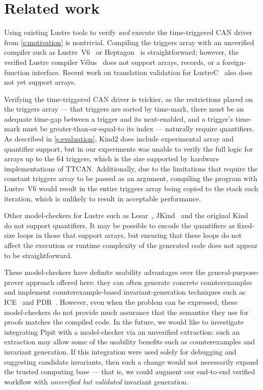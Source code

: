 
\section{Related work}
\label{s:related-work}


Using existing Lustre tools to verify \emph{and} execute the time-triggered CAN driver from \autoref{s:motivation} is nontrivial.
Compiling the triggers array with an unverified compiler such as Lustre~V6~\cite{jahier2016lustre} or Heptagon~\cite{gerard2012modular} is straightforward; however, the verified Lustre compiler Vélus~\cite{bourke2023verified} does not support arrays, records, or a foreign-function interface.
Recent work on translation validation for LustreC~\cite{brun2023equation} also does not yet support arrays.

Verifying the time-triggered CAN driver is trickier, as the restrictions placed on the triggers array --- that triggers are sorted by time-mark, there must be an adequate time-gap between a trigger and its next-enabled, and a trigger's time-mark must be greater-than-or-equal-to its index --- naturally require quantifiers.
As described in \autoref{s:evaluation}, Kind2 does include experimental array and quantifier support, but in our experiments was unable to verify the full logic for arrays up to the 64 triggers, which is the size supported by hardware implementations of TTCAN.
Additionally, due to the limitations that require the constant triggers array to be passed as an argument, compiling the program with Lustre~V6 would result in the entire triggers array being copied to the stack each iteration, which is unlikely to result in acceptable performance.

Other model-checkers for Lustre such as Lesar~\cite{raymond2008synchronous}, JKind~\cite{gacek2018jkind} and the original Kind~\cite{hagen2008scaling} do not support quantifiers.
It may be possible to encode the quantifiers as fixed-size loops in those that support arrays, but ensuring that these loops do not affect the execution or runtime complexity of the generated code does not appear to be straightforward.

These model-checkers have definite usability advantages over the general-purpose-prover approach offered here: they can often generate concrete counterexamples and implement counterexample-based invariant-generation techniques such as ICE~\cite{garg2014ice} and PDR~\cite{bradley2011sat,een2011efficient}.
However, even when the problem can be expressed, these model-checkers do not provide much assurance that the semantics they use for proofs matches the compiled code.
In the future, we would like to investigate integrating Pipit with a model-checker via an unverified extraction: such an extraction may allow some of the usability benefits such as counterexamples and invariant generation.
If this integration were used solely for debugging and suggesting candidate invariants, then such a change would not necessarily expand the trusted computing base --- that is, we could augment our end-to-end verified workflow with \emph{unverified but validated} invariant generation.

